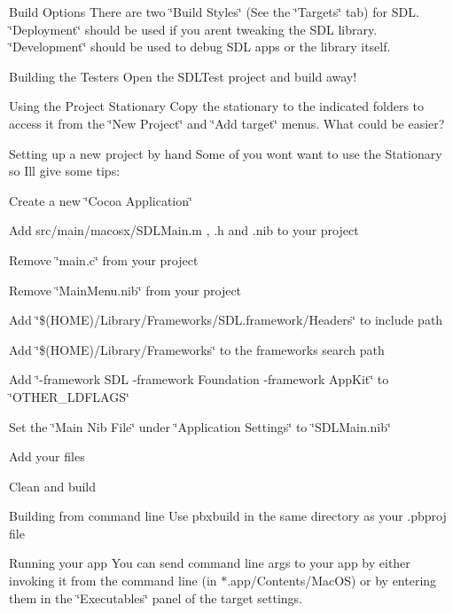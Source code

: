 \begin{DoxyItemize}
\item Build Options There are two \char`\"{}\+Build Styles\char`\"{} (See the \char`\"{}\+Targets\char`\"{} tab) for S\+DL. \char`\"{}\+Deployment\char`\"{} should be used if you aren\textquotesingle{}t tweaking the S\+DL library. \char`\"{}\+Development\char`\"{} should be used to debug S\+DL apps or the library itself.
\item Building the Testers Open the S\+D\+L\+Test project and build away!
\item Using the Project Stationary Copy the stationary to the indicated folders to access it from the \char`\"{}\+New Project\char`\"{} and \char`\"{}\+Add target\char`\"{} menus. What could be easier?
\item Setting up a new project by hand Some of you won\textquotesingle{}t want to use the Stationary so I\textquotesingle{}ll give some tips\+:
\begin{DoxyItemize}
\item Create a new \char`\"{}\+Cocoa Application\char`\"{}
\item Add src/main/macosx/\+S\+D\+L\+Main.\+m , .h and .nib to your project
\item Remove \char`\"{}main.\+c\char`\"{} from your project
\item Remove \char`\"{}\+Main\+Menu.\+nib\char`\"{} from your project
\item Add \char`\"{}\$(\+H\+O\+M\+E)/\+Library/\+Frameworks/\+S\+D\+L.\+framework/\+Headers\char`\"{} to include path
\item Add \char`\"{}\$(\+H\+O\+M\+E)/\+Library/\+Frameworks\char`\"{} to the frameworks search path
\item Add \char`\"{}-\/framework S\+D\+L -\/framework Foundation -\/framework App\+Kit\char`\"{} to \char`\"{}\+O\+T\+H\+E\+R\+\_\+\+L\+D\+F\+L\+A\+G\+S\char`\"{}
\item Set the \char`\"{}\+Main Nib File\char`\"{} under \char`\"{}\+Application Settings\char`\"{} to \char`\"{}\+S\+D\+L\+Main.\+nib\char`\"{}
\item Add your files
\item Clean and build
\end{DoxyItemize}
\item Building from command line Use pbxbuild in the same directory as your .pbproj file
\item Running your app You can send command line args to your app by either invoking it from the command line (in $\ast$.app/\+Contents/\+Mac\+OS) or by entering them in the \char`\"{}\+Executables\char`\"{} panel of the target settings.

\end{DoxyItemize}
